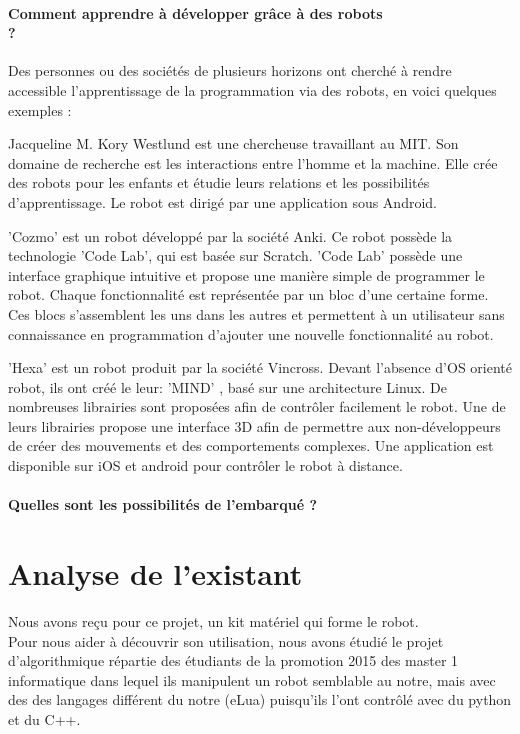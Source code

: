 \documentclass[12pt,francais]{report}
\begin{document}
\paragraph*{Comment apprendre à développer grâce à des robots \\?}

Des personnes ou des sociétés de plusieurs horizons ont cherché à rendre accessible l'apprentissage de la programmation via des robots, en voici quelques exemples :

Jacqueline M. Kory Westlund est une chercheuse travaillant au MIT. Son domaine de recherche est les interactions entre l'homme et la machine.
Elle crée des robots pour les enfants et étudie leurs relations et les possibilités d'apprentissage.\cite{ref9}
Le robot est dirigé par une application sous Android.

'Cozmo' est un robot développé par la société Anki. Ce robot possède la technologie 'Code Lab', qui est basée sur Scratch.\cite{ref10} 
'Code Lab' possède une interface graphique intuitive et propose une manière simple de programmer le robot.
Chaque fonctionnalité est représentée par un bloc d'une certaine forme.
Ces blocs s'assemblent les uns dans les autres et permettent à un utilisateur sans connaissance en programmation d'ajouter une nouvelle fonctionnalité au robot.

'Hexa' est un robot produit par la société Vincross. Devant l'absence d'OS orienté robot, ils ont créé le leur: 'MIND' \cite{ref11},
basé sur une architecture Linux. De nombreuses librairies sont proposées afin de contrôler facilement le robot.
Une de leurs librairies propose une interface 3D afin de permettre aux non-développeurs de créer des mouvements et des comportements complexes.
Une application est disponible sur iOS et android pour contrôler le robot à distance.

\paragraph*{Quelles sont les possibilités de l'embarqué ?\\}


\newpage
\section*{Analyse de l'existant}

Nous avons reçu pour ce projet, un kit matériel qui forme le robot.\\
Pour nous aider à découvrir son utilisation, nous avons étudié le projet d'algorithmique répartie des étudiants de la promotion 2015 des master 1 informatique \cite{ref1} dans lequel ils manipulent un robot semblable au notre, mais avec des des langages différent du notre (eLua) puisqu'ils l'ont contrôlé avec du python et du C++.
\end{document}
